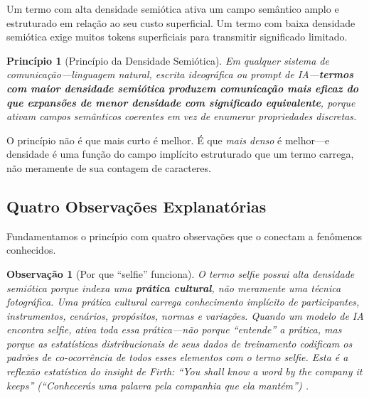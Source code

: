 \documentclass[12pt,a4paper]{article}
\newtheorem{principle}{Princípio}[section]
\newtheorem{observation}{Observação}[section]
\begin{document}
Um termo com alta densidade semiótica ativa um campo semântico amplo e estruturado em relação ao seu custo superficial.
Um termo com baixa densidade semiótica exige muitos tokens superficiais para transmitir significado limitado.

\begin{principle}[Princípio da Densidade Semiótica]
\label{principle:psd}
Em qualquer sistema de comunicação---linguagem natural, escrita ideográfica ou prompt de IA---\textbf{termos com maior densidade semiótica produzem comunicação mais eficaz do que expansões de menor densidade com significado equivalente}, porque ativam campos semânticos coerentes em vez de enumerar propriedades discretas.
\end{principle}

O princípio não é que mais curto é melhor.
É que \textit{mais denso} é melhor---e densidade é uma função do campo implícito estruturado que um termo carrega, não meramente de sua contagem de caracteres.

\subsection{Quatro Observações Explanatórias}

Fundamentamos o princípio com quatro observações que o conectam a fenômenos conhecidos.

\begin{observation}[Por que ``selfie'' funciona]
\label{obs:selfie}
O termo \textit{selfie} possui alta densidade semiótica porque indexa uma \textbf{prática cultural}, não meramente uma técnica fotográfica.
Uma prática cultural carrega conhecimento implícito de participantes, instrumentos, cenários, propósitos, normas e variações.
Quando um modelo de IA encontra \textit{selfie}, ativa toda essa prática---não porque ``entende'' a prática, mas porque as estatísticas distribucionais de seus dados de treinamento codificam os padrões de co-ocorrência de todos esses elementos com o termo \textit{selfie}.
Esta é a reflexão estatística do insight de Firth: ``You shall know a word by the company it keeps'' (``Conhecerás uma palavra pela companhia que ela mantém'') \cite{firth1957}.
\end{observation}
\end{document}
